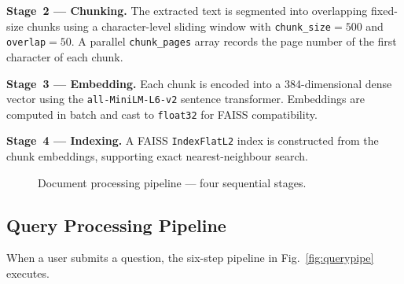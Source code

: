 \documentclass[conference]{IEEEtran}
\begin{document}
\textbf{Stage~2 --- Chunking.}
The extracted text is segmented into overlapping fixed-size chunks using
a character-level sliding window with \texttt{chunk\_size}$=500$ and
\texttt{overlap}$=50$.
A parallel \texttt{chunk\_pages} array records the page number of the
first character of each chunk.

\textbf{Stage~3 --- Embedding.}
Each chunk is encoded into a 384-dimensional dense vector using the
\texttt{all-MiniLM-L6-v2} sentence transformer.
Embeddings are computed in batch and cast to \texttt{float32} for FAISS
compatibility.

\textbf{Stage~4 --- Indexing.}
A FAISS \texttt{IndexFlatL2} index is constructed from the chunk
embeddings, supporting exact nearest-neighbour search.

\begin{figure}[t]
\centering
{}
\caption{Document processing pipeline --- four sequential stages.}
\label{fig:docpipe}
\end{figure}

\subsection{Query Processing Pipeline}
When a user submits a question, the six-step pipeline in
Fig.~\ref{fig:querypipe} executes.
\end{document}
